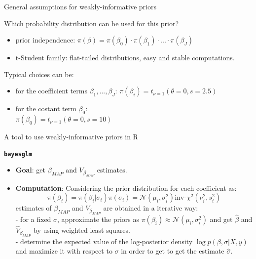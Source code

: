 \documentclass{beamer}
\begin{document}
\begin{frame}{General assumptions for weakly-informative priors}
	
	Which probability distribution can be used for this prior?
	
	\vspace{0.2cm}
	
	\begin{itemize}
		\item prior independence: $\pi(\beta) = \pi(\beta_0) \cdot \pi(\beta_1) \cdot ... \cdot \pi(\beta_J)$ 
		\item t-Student family: flat-tailed distributions, easy and stable computations.
	\end{itemize}
	Typical choices can be:
	\begin{itemize}
		\item  for the coefficient terms $\beta_1, ..., \beta_J$:
		$\pi(\beta_i) = t_{\nu=1}(\theta=0, s=2.5)$
		\vspace{0.3cm}
		\item for the costant term $\beta_0$: \\
		$\pi(\beta_0) = t_{\nu=1}(\theta=0, s=10)$
	\end{itemize}
	
\end{frame}



\begin{frame}{A tool to use weakly-informative priors in R}
	
		\centering
		\textbf{\texttt{bayesglm}}\\
		\vspace{0.2cm}
		\begin{itemize}
			\item \textbf{Goal}: \small get $\beta_{MAP}$ and $V_{\beta_{MAP}}$ estimates.
			\item \textbf{Computation}: \small {Considering the prior distribution for each coefficient as:}  $$\pi(\beta_i) = \pi(\beta_i|\sigma_i) \pi(\sigma_i) = \mathcal{N}(\mu_i, \sigma_i^2) \text{inv-}\chi^2(\nu^2_i, s^2_i)$$
			estimates of $\beta_{MAP}$ and $V_{\beta_{MAP}}$ are obtained in a iterative way: \\
			\vspace{0.2cm}
			- for a fixed $\sigma$, approximate the priors as $\pi(\beta_i) \approx \mathcal{N}(\mu_i, \sigma_i^2)$ and get $\hat{\beta}$ and $\hat{V}_{\beta_{MAP}}$ by using weighted least squares. \\
			- determine the expected value of the log-posterior density $\log p(\beta, \sigma | X, y)$ and maximize it with respect to $\sigma$ in order to get to get the estimate $\hat{\sigma}$.
		\end{itemize}
		
\end{frame}
\end{document}
